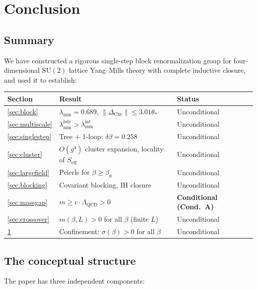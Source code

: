 \documentclass[11pt]{article}
\theoremstyle{definition}
\newcommand{\SU}{\mathrm{SU}}
\newcommand{\Lam}{\Lambda_{\mathrm{QCD}}}
\begin{document}
\section{Conclusion}\label{sec:conclusion}

\subsection{Summary}

We have constructed a rigorous single-step block renormalization
group for four-dimensional $\SU(2)$ lattice Yang--Mills theory with
complete inductive closure, and used it to establish:

\begin{center}
\begin{tabular}{lll}
\toprule
\textbf{Section} & \textbf{Result} & \textbf{Status}\\
\midrule
\ref{sec:block} & $\lambda_{\min}=0.689$, $\|\Delta_{\mathrm{Chr}}\|\le 3.01\theta_*$ &
Unconditional\\
\ref{sec:multiscale} & $\lambda_{\min}^{\mathrm{bdy}}>
\lambda_{\min}^{\mathrm{int}}$ & Unconditional\\
\ref{sec:singlestep} & Tree + 1-loop: $\delta\beta=0.258$ &
Unconditional\\
\ref{sec:cluster} & $O(g^4)$ cluster expansion, locality of $S_{\mathrm{eff}}$ &
Unconditional\\
\ref{sec:largefield} & Peierls for $\beta\ge\beta_0$ &
Unconditional\\
\ref{sec:blocking} & Covariant blocking, IH closure &
Unconditional\\
\ref{sec:massgap} & $m\ge c\cdot\Lam>0$ &
\textbf{Conditional (Cond.~A)}\\
\ref{sec:crossover} & $m(\beta,L)>0$ for all $\beta$ (finite $L$) &
Unconditional\\
\ref{sec:conclusion} & Confinement: $\sigma(\beta)>0$ for all $\beta$ &
Unconditional\\
\bottomrule
\end{tabular}
\end{center}

\subsection{The conceptual structure}

The paper has three independent components:
\end{document}
